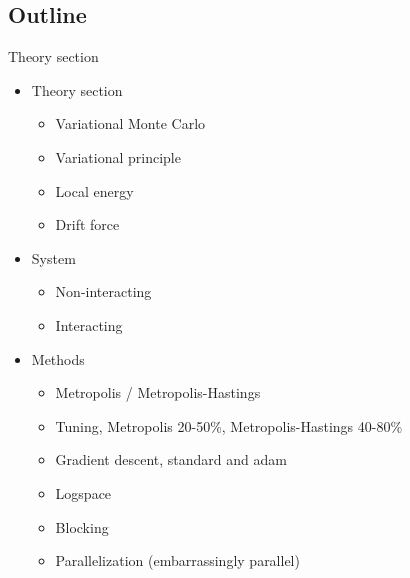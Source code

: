 \subsection{Outline}


Theory section 

\begin{itemize}
    \item Theory section
    \begin{itemize}
        \item Variational Monte Carlo
        \item Variational principle
        \item Local energy
        \item Drift force
    \end{itemize}
    \item System
    \begin{itemize}
        \item Non-interacting
        \item Interacting
    \end{itemize}
    \item Methods
    \begin{itemize}
        \item Metropolis / Metropolis-Hastings
        \item Tuning, Metropolis 20-50\%, Metropolis-Hastings 40-80\% 
        \item Gradient descent, standard and adam 
        \item Logspace
        \item Blocking
        \item Parallelization (embarrassingly parallel) 
    \end{itemize}
\end{itemize}

